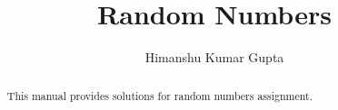 \documentclass[journal,12pt,twocolumn]{IEEEtran}
\begin{document}
	\providecommand{\dec}[2]{\ensuremath{\overset{#1}{\underset{#2}{\gtrless}}}}
	\DeclarePairedDelimiter{\ceil}{\lceil}{\rceil}
	\makeatletter
	\makeatother
	\renewcommand{\thefigure}{\arabic{section}.\arabic{figure}}
	\let\StandardTheFigure\thefigure
	\let\StandardTheTable\thetable
	\let\vec\mathbf
	\vspace{3cm}
	\title{%
		Random Numbers
	}
	\author{Himanshu Kumar Gupta}
	\maketitle
	\tableofcontents
	\bigskip
	\begin{abstract}
		This manual provides solutions for random numbers assignment.
	\end{abstract}
	
\end{document}
